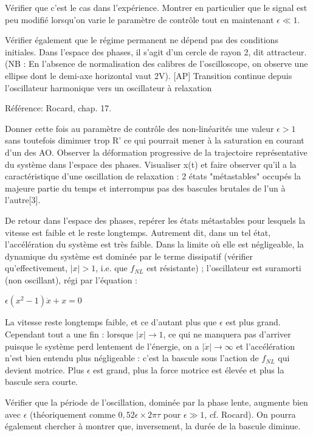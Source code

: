 \documentclass{article}%
\begin{document}
Vérifier que c'est le cas dans l'expérience. Montrer en particulier que le signal est peu modifié lorsqu'on varie le paramètre de contrôle tout en maintenant $\epsilon\ll 1$.

Vérifier également que le régime permanent ne dépend pas des conditions initiales. Dans l'espace des phases, il s'agit d'un cercle de rayon 2, dit attracteur. (NB : En l'absence de normalisation des calibres de l'oscilloscope, on observe une ellipse dont le demi-axe horizontal vaut 2V).
[AP] Transition continue depuis l'oscillateur harmonique vers un oscillateur à relaxation

Référence: Rocard, chap. 17.

Donner cette fois au paramètre de contrôle des non-linéarités une valeur $\epsilon >1$ sans toutefois diminuer trop R' ce qui pourrait mener à la saturation en courant d'un des AO. Observer la déformation progressive de la trajectoire représentative du système dans l'espace des phases. Visualiser x(t) et faire observer qu'il a la caractéristique d'une oscillation de relaxation : 2 états "métastables" occupés la majeure partie du temps et interrompus pas des bascules brutales de l'un à l'autre[3].

De retour dans l'espace des phases, repérer les états métastables pour lesquels la vitesse est faible et le reste longtemps. Autrement dit, dans un tel état, l'accélération du système est très faible. Dans la limite où elle est négligeable, la dynamique du système est dominée par le terme dissipatif (vérifier qu'effectivement, $\vert x\vert >1$, i.e. que $f_{NL}$ est résistante) ; l'oscillateur est suramorti (non oscillant), régi par l'équation :

    $ \epsilon \left(x^2-1\right) \dot x+x=0$

La vitesse reste longtemps faible, et ce d'autant plus que $\epsilon$ est plus grand. Cependant tout a une fin : lorsque $\vert x\vert\to 1$, ce qui ne manquera pas d'arriver puisque le système perd lentement de l'énergie, on a $\vert\dot x\vert\to\infty$ et l'accélération n'est bien entendu plus négligeable : c'est la bascule sous l'action de $f_{NL}$ qui devient motrice. Plus $\epsilon$ est grand, plus la force motrice est élevée et plus la bascule sera courte.

Vérifier que la période de l'oscillation, dominée par la phase lente, augmente bien avec $\epsilon$ (théoriquement comme $0,52\epsilon\times 2\pi \tau$ pour $\epsilon \gg 1$, cf. Rocard). On pourra également chercher à montrer que, inversement, la durée de la bascule diminue.
\end{document}
